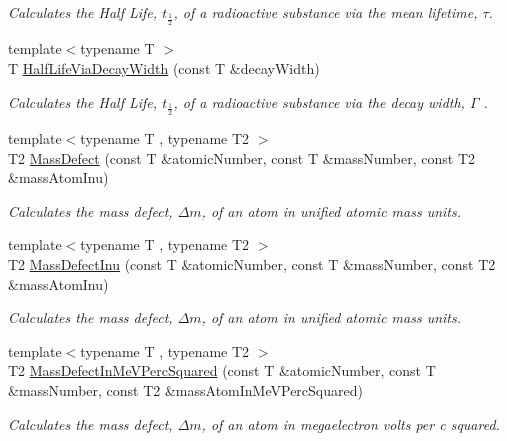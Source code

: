 \begin{DoxyCompactItemize}
\begin{DoxyCompactList}\small\item\em Calculates the Half Life, $t_{\frac{1}{2}}$, of a radioactive substance via the mean lifetime, $\tau$. \end{DoxyCompactList}\item 
{\footnotesize template$<$typename T $>$ }\\T \mbox{\hyperlink{group___e_g_x_phys-_half_life_gaba3fda944d1a68ee1016a1f2f5809359}{Half\+Life\+Via\+Decay\+Width}} (const T \&decay\+Width)
\begin{DoxyCompactList}\small\item\em Calculates the Half Life, $t_{\frac{1}{2}}$, of a radioactive substance via the decay width, $\Gamma$ . \end{DoxyCompactList}\item 
{\footnotesize template$<$typename T , typename T2 $>$ }\\T2 \mbox{\hyperlink{group___e_g_x_phys-_mass_defect_gae89f2dfa65992c0314adc2440b2f582a}{Mass\+Defect}} (const T \&atomic\+Number, const T \&mass\+Number, const T2 \&mass\+Atom\+Inu)
\begin{DoxyCompactList}\small\item\em Calculates the mass defect, $\Delta m$, of an atom in unified atomic mass units. \end{DoxyCompactList}\item 
{\footnotesize template$<$typename T , typename T2 $>$ }\\T2 \mbox{\hyperlink{group___e_g_x_phys-_mass_defect_ga70400004a5cb622de372ab84670731ef}{Mass\+Defect\+Inu}} (const T \&atomic\+Number, const T \&mass\+Number, const T2 \&mass\+Atom\+Inu)
\begin{DoxyCompactList}\small\item\em Calculates the mass defect, $\Delta m$, of an atom in unified atomic mass units. \end{DoxyCompactList}\item 
{\footnotesize template$<$typename T , typename T2 $>$ }\\T2 \mbox{\hyperlink{group___e_g_x_phys-_mass_defect_gab51169bf871d0ea0ee0642fa300228fe}{Mass\+Defect\+In\+Me\+V\+Perc\+Squared}} (const T \&atomic\+Number, const T \&mass\+Number, const T2 \&mass\+Atom\+In\+Me\+V\+Perc\+Squared)
\begin{DoxyCompactList}\small\item\em Calculates the mass defect, $\Delta m$, of an atom in megaelectron volts per c squared. \end{DoxyCompactList}\item 

\end{DoxyCompactItemize}

